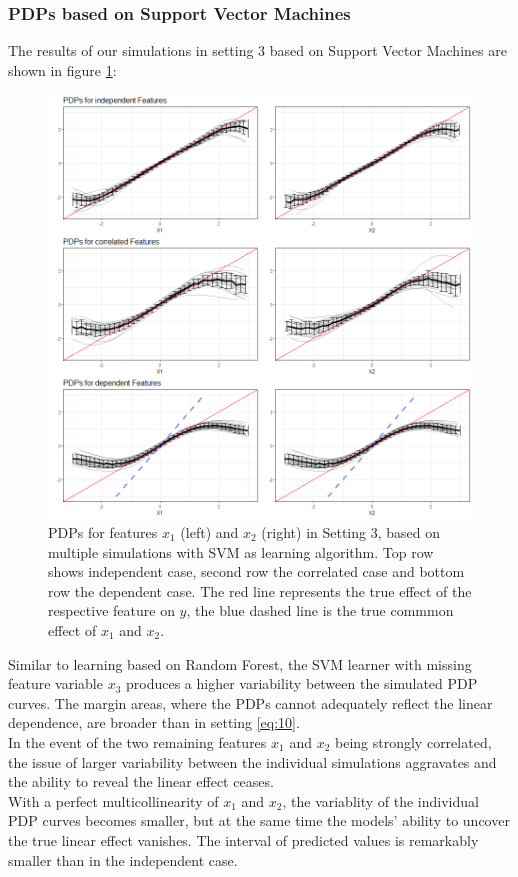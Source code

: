 \documentclass[
]{krantz}
\begin{document}
\hypertarget{pdps-based-on-support-vector-machines-2}{%
\subsubsection{PDPs based on Support Vector Machines}\label{pdps-based-on-support-vector-machines-2}}

The results of our simulations in setting 3 based on Support Vector Machines are shown in figure \ref{fig:Figure21}:

\begin{figure}

\includegraphics[width=1\linewidth]{images/VK_PDP_21_Set3_SVM} \hfill{}

\caption{PDPs for features $x_1$ (left) and $x_2$  (right) in Setting 3, based on multiple simulations with SVM as learning algorithm. Top row shows independent case, second row the correlated case and bottom row the dependent case. The red line represents the true effect of the respective feature on $y$, the blue dashed line is the true commmon effect of $x_1$ and $x_2$.}\label{fig:Figure21}
\end{figure}

Similar to learning based on Random Forest, the SVM learner with missing feature variable \(x_3\) produces a higher variability between the simulated PDP curves. The margin areas, where the PDPs cannot adequately reflect the linear dependence, are broader than in setting \eqref{eq:10}.\\
In the event of the two remaining features \(x_1\) and \(x_2\) being strongly correlated, the issue of larger variability between the individual simulations aggravates and the ability to reveal the linear effect ceases.\\
With a perfect multicollinearity of \(x_1\) and \(x_2\), the variablity of the individual PDP curves becomes smaller, but at the same time the models' ability to uncover the true linear effect vanishes. The interval of predicted values is remarkably smaller than in the independent case.
\end{document}
